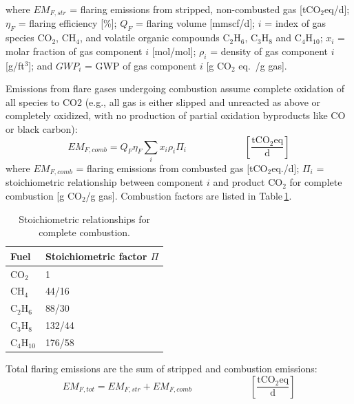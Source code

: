 \documentclass[11pt]{report}
\newcommand{\eqnunitfrac}[2]{\quad\quad \scriptstyle{\left[\frac{\text{#1}}{\text{#2}}\right]}}
\begin{document}
where $EM_{F,str}$ = flaring emissions from stripped, non-combusted gas [tCO$_{2}$eq/d]; $\eta_{F}$ = flaring efficiency [\%]; $Q_{F}$ = flaring volume [mmscf/d]; $i$ = index of gas species CO$_{2}$, CH$_{4}$, and volatile organic compounds C$_{2}$H$_{6}$, C$_{3}$H$_{8}$ and C$_{4}$H$_{10}$; $x_i$ = molar fraction of gas component $i$ [mol/mol]; $\rho _{i}$ = density of gas component $i$ [g/ft$^{3}$]; and $GWP_{i}$ = GWP of gas component $i$ [g CO$_2$ eq.\ /g gas]. 

Emissions from flare gases undergoing combustion assume complete oxidation of all species to CO2 (e.g., all gas is either slipped and unreacted as above or completely oxidized, with no production of partial oxidation byproducts like CO or black carbon): 
\begin{equation} \label{eq:flare_emissions_combustion}
EM_{F,comb} = Q_{F} \eta_{F} \sum_i x_i \rho _{i} \Pi_{i} \quad \quad \quad\quad\eqnunitfrac{tCO$_{2}$eq}{d}
\end{equation}
where $EM_{F,comb}$ = flaring emissions from combusted gas [tCO$_{2}$eq./d]; $\Pi_{i}$ = stoichiometric relationship between component $i$ and product CO$_{2}$ for complete combustion [g CO$_2$/g gas]. Combustion factors are listed in Table\,\ref{tab:stoichiometric_relationships}. 

\begin{table}
\begin{scriptsize}
\caption{Stoichiometric relationships for complete combustion.}
\label{tab:stoichiometric_relationships}
\begin{tabular*}{0.75\columnwidth}{p{}p{}}
\toprule
Fuel & Stoichiometric factor $\Pi$ \\
\midrule
CO$_2$ & 1 \\
CH$_{4}$ & 44/16 \\
C$_{2}$H$_{6}$ & 88/30 \\
C$_{3}$H$_{8}$ & 132/44 \\
C$_{4}$H$_{10}$ & 176/58 \\
\bottomrule
\end{tabular*}
\end{scriptsize}
\end{table}

Total flaring emissions are the sum of stripped and combustion emissions:
\begin{equation} \label{eq:flare_emissions_total}
EM_{F,tot} = EM_{F,str} + EM_{F,comb} \quad \quad \quad\quad\eqnunitfrac{tCO$_{2}$eq}{d}
\end{equation}
\end{document}

